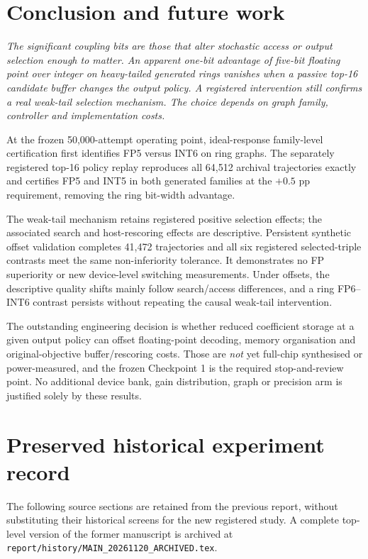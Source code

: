 \documentclass[11pt,a4paper,oneside]{report}
\begin{document}
\chapter{Conclusion and future work}
\noindent\emph{The significant coupling bits are
those that alter stochastic access or
output selection enough to matter.
An apparent one-bit advantage of
five-bit floating point over integer
on heavy-tailed generated rings
vanishes when a passive top-16
candidate buffer changes the output
policy. A registered intervention
still confirms a real weak-tail
selection mechanism. The choice
depends on graph family, controller
and implementation costs.}

At the frozen 50,000-attempt operating
point, ideal-response family-level
certification first identifies
FP5 versus INT6 on ring graphs.
The separately registered top-16
policy replay reproduces all 64,512
archival trajectories exactly and
certifies FP5 and INT5 in both
generated families at the
$+0.5$ pp requirement, removing
the ring bit-width advantage.

The weak-tail mechanism retains
registered positive selection effects;
the associated search and
host-rescoring effects are descriptive.
Persistent synthetic offset validation
completes 41,472 trajectories and
all six registered selected-triple
contrasts meet the same non-inferiority
tolerance. It demonstrates no FP
superiority or new device-level
switching measurements. Under offsets,
the descriptive quality shifts mainly
follow search/access differences, and
a ring FP6--INT6 contrast persists
without repeating the causal
weak-tail intervention.

The outstanding engineering decision
is whether reduced coefficient storage
at a given output policy can offset
floating-point decoding, memory
organisation and original-objective
buffer/rescoring costs. Those are
\emph{not} yet full-chip synthesised
or power-measured, and the frozen
Checkpoint 1 is the required
stop-and-review point. No additional
device bank, gain distribution, graph
or precision arm is justified solely
by these results.

\clearpage


\appendix
\chapter{Preserved historical experiment record}
The following source sections are retained from the
previous report, without substituting their historical
screens for the new registered study. A complete
top-level version of the former manuscript is
archived at
\texttt{report/history/MAIN\_20261120\_ARCHIVED.tex}.







\end{document}
